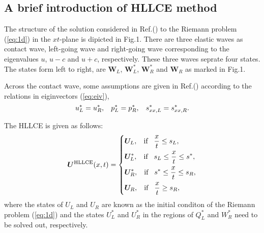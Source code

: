 \documentclass{article}
\theoremstyle{plain}\newtheorem{definition}{\sc{Definition}}
\theoremstyle{defination}\newtheorem{example}{Example}[section]
\numberwithin{equation}{section}
\numberwithin{table}{section}
\begin{document}
  \subsection{ A  brief  introduction of HLLCE method \cite{}}

  The structure of the solution considered in Ref.(\cite{}) to the Riemann problem (\ref{eq:1d}) in the $xt$-plane  is dipicted in Fig.1. There are three elastic  waves as contact wave, left-going wave and  right-going  wave  corresponding to the eigenvalues $u$, $u-c$ and $u+c$, respectively. These three waves seprate four  states. The states  form left to right, are  $\bm{W}_L$, $\bm{W}_L^*$, $\bm{W}_R^* $ and $\bm{W}_R$ as marked in Fig.1.

  Across the contact wave, some assumptions are given in Ref.(\cite{}) according to the relations in eiginvectors (\ref{eq:eiv}), 
  \begin{equation}
	u_L^* = u_R^*, \hspace{0.3cm} p_L^* = p_R^*, \hspace{0.3cm} s_{xx,L}^* = s_{xx,R}^*.
  \end{equation}

  The HLLCE is given as follows:
  \begin{equation}
	\bm{U}^{\text{HLLCE}}(x,t) = \left\{ \begin{aligned}
		& \bm{U}_L, \hspace{0.3cm} \text{if} \hspace{0.3cm} \frac{x}{t}\le s_L, \\
		& \bm{U}_L^*, \hspace{0.3cm} \text{if} \hspace{0.3cm} s_L\le \frac{x}{t} \le s^*, \\
		& \bm{U}_R^*, \hspace{0.3cm} \text{if} \hspace{0.3cm} s^*\le \frac{x}{t} \le s_R,\\
		& \bm{U}_R, \hspace{0.3cm} \text{if} \hspace{0.3cm} \frac{x}{t}\ge s_R, \\
	  \end{aligned}
	\right.
  \end{equation}
  where the states of $U_L$ and $U_R$ are known as the initial conditon of the Riemann problem (\ref{eq:1d}) and the states $U_L^*$ and $U_R^*$ in the regions of $Q_L^*$ and $W_R^*$ need to be solved out, respectively.
\end{document}
